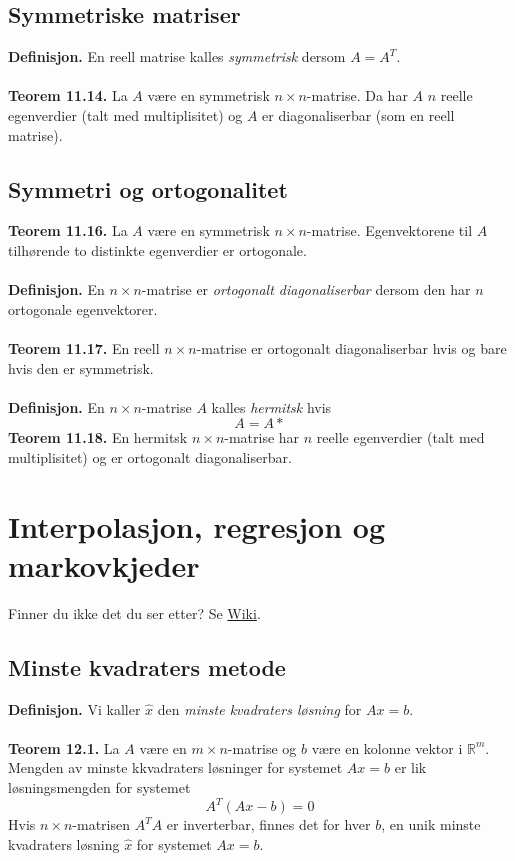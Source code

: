 \documentclass{article}
\begin{document}
\subsection{Symmetriske matriser}
\textbf{Definisjon.} En reell matrise kalles \textit{symmetrisk} dersom $A = A^T$.
\\\\
\textbf{Teorem 11.14.} La $A$ være en symmetrisk $n \times n$-matrise. Da har $A$ $n$ reelle egenverdier (talt med multiplisitet) og $A$ er diagonaliserbar (som en reell matrise).


\subsection{Symmetri og ortogonalitet}
\textbf{Teorem 11.16.} La $A$ være en symmetrisk $n \times n$-matrise. Egenvektorene til $A$ tilhørende to distinkte egenverdier er ortogonale.
\\\\
\textbf{Definisjon.} En $n \times n$-matrise er \textit{ortogonalt diagonaliserbar} dersom den har $n$ ortogonale egenvektorer.
\\\\
\textbf{Teorem 11.17.} En reell $n \times n$-matrise er ortogonalt diagonaliserbar hvis og bare hvis den er symmetrisk.
\\\\
\textbf{Definisjon.} En $n \times n$-matrise $A$ kalles \textit{hermitsk} hvis
\[ A = A* \]
\textbf{Teorem 11.18.} En hermitsk $n \times n$-matrise har $n$ reelle egenverdier (talt med multiplisitet) og er ortogonalt diagonaliserbar.




\clearpage
\section{Interpolasjon, regresjon og markovkjeder}
Finner du ikke det du ser etter? Se \href{https://www.math.ntnu.no/emner/TMA4110/2020h/notater/12\%20-\%20Interpolasjon,\%20regresjon\%20og\%20markovkjeder.pdf}{Wiki}.


\subsection{Minste kvadraters metode}
\textbf{Definisjon.} Vi kaller $\hat{x}$ den \textit{minste kvadraters løsning} for $Ax = b$.
\\\\
\textbf{Teorem 12.1.} La $A$ være en $m \times n$-matrise og $b$ være en kolonne vektor i $\mathbb{R}^m$. Mengden av minste kkvadraters løsninger for systemet $Ax = b$ er lik løsningsmengden for systemet
\[ A^T(Ax-b)=0 \]
Hvis $n \times n$-matrisen $A^TA$ er inverterbar, finnes det for hver $b$, en unik minste kvadraters løsning $\hat{x}$ for systemet $Ax = b$.
\end{document}
